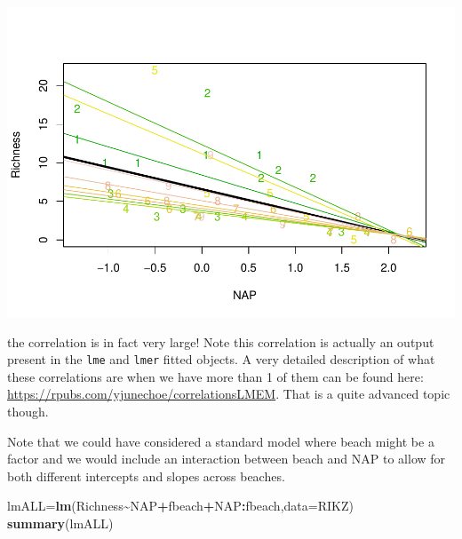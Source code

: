 \documentclass[
]{book}
\newenvironment{Shaded}{\begin{snugshade}}{\end{snugshade}}
\newcommand{\AttributeTok}[1]{\textcolor[rgb]{0.13,0.29,0.53}{#1}}
\newcommand{\FunctionTok}[1]{\textcolor[rgb]{0.13,0.29,0.53}{\textbf{#1}}}
\newcommand{\NormalTok}[1]{#1}
\newcommand{\OtherTok}[1]{\textcolor[rgb]{0.56,0.35,0.01}{#1}}
\newcommand{\SpecialCharTok}[1]{\textcolor[rgb]{0.81,0.36,0.00}{\textbf{#1}}}
\begin{document}
\includegraphics{ECOMODbook_files/figure-latex/unnamed-chunk-60-1.pdf}

the correlation is in fact very large! Note this correlation is actually an output present in the \texttt{lme} and \texttt{lmer} fitted objects. A very detailed description of what these correlations are when we have more than 1 of them can be found here: \url{https://rpubs.com/yjunechoe/correlationsLMEM}. That is a quite advanced topic though.

Note that we could have considered a standard model where beach might be a factor and we would include an interaction between beach and NAP to allow for both different intercepts and slopes across beaches.

\begin{Shaded}
\begin{Highlighting}[]
\NormalTok{lmALL}\OtherTok{=}\FunctionTok{lm}\NormalTok{(Richness}\SpecialCharTok{\textasciitilde{}}\NormalTok{NAP}\SpecialCharTok{+}\NormalTok{fbeach}\SpecialCharTok{+}\NormalTok{NAP}\SpecialCharTok{:}\NormalTok{fbeach,}\AttributeTok{data=}\NormalTok{RIKZ)}
\FunctionTok{summary}\NormalTok{(lmALL)}
\end{Highlighting}
\end{Shaded}
\end{document}
